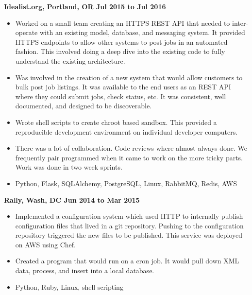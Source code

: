 \documentclass{res}
\begin{document}
\begin{resume}
\begin{itemize}
  \end{itemize}

  {\large \bf Idealist.org, Portland, OR \hfill Jul 2015 to Jul 2016}

  \begin{itemize} \item
    Worked on a small team creating an HTTPS REST API that needed
    to inter-operate with an existing model, database, and messaging
    system. It provided HTTPS endpoints to allow other systems to post
    jobs in an automated fashion.  This involved doing
    a deep dive into the existing code to fully understand the existing
    architecture.

    \item

    Was involved in the creation of a new system that would allow
    customers to bulk post job listings.  It was available to the end users
    as an REST API where they could submit jobs, check status, etc.
    It was consistent, well documented, and designed to be discoverable.

  \item

    Wrote shell scripts to create chroot based sandbox.  This provided
    a reproducible development environment on individual developer
    computers.

    \item

    There was a lot of collaboration.  Code reviews where almost always
    done.  We frequently pair programmed when it came to work on the
    more tricky parts.  Work was done in two week sprints.

  \item

    Python, Flask, SQLAlchemy, PostgreSQL, Linux, RabbitMQ, Redis, AWS

  \end{itemize}

  {\large \bf Rally, Wash, DC \hfill Jun 2014 to Mar 2015}

  \begin{itemize}

  \item
    Implemented a configuration system which used HTTP to
    internally publish configuration files that lived in a git repository.
    Pushing to the configuration repository triggered the new files
    to be published.  This service was deployed on AWS using Chef.
  \item
    Created a program that would run on a cron job.  It would pull down
    XML data, process, and insert into a local database.
  \item
    Python, Ruby, Linux, shell scripting


\end{itemize}
\end{resume}
\end{document}
